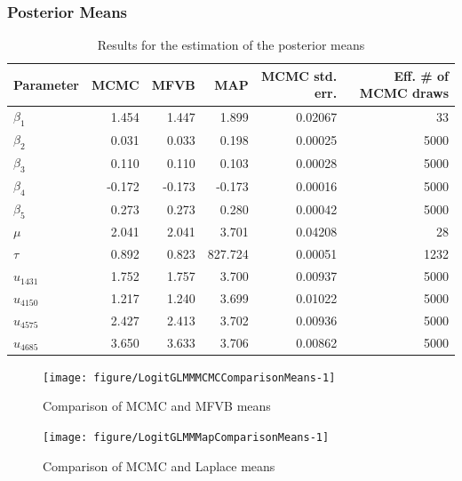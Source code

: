 \documentclass{article}\usepackage[]{graphicx}\usepackage[]{color}
\newenvironment{knitrout}{}{}
\theoremstyle{definition}
\theoremstyle{plain}
\theoremstyle{plain}
\theoremstyle{plain}
\theoremstyle{definition}
\theoremstyle{plain}
\theoremstyle{plain}
\begin{document}
\subsubsection{Posterior Means}

\begin{table}
\begin{center}\begin{tabular}{lrrrrr}
  \hline
Parameter & MCMC & MFVB & MAP & MCMC std. err. & Eff. \# of MCMC draws \\ 
  \hline
$\beta_{1}$ & 1.454 & 1.447 & 1.899 & 0.02067 & 33 \\ 
  $\beta_{2}$ & 0.031 & 0.033 & 0.198 & 0.00025 & 5000 \\ 
  $\beta_{3}$ & 0.110 & 0.110 & 0.103 & 0.00028 & 5000 \\ 
  $\beta_{4}$ & -0.172 & -0.173 & -0.173 & 0.00016 & 5000 \\ 
  $\beta_{5}$ & 0.273 & 0.273 & 0.280 & 0.00042 & 5000 \\ 
  $\mu$ & 2.041 & 2.041 & 3.701 & 0.04208 & 28 \\ 
  $\tau$ & 0.892 & 0.823 & 827.724 & 0.00051 & 1232 \\ 
  $u_{1431}$ & 1.752 & 1.757 & 3.700 & 0.00937 & 5000 \\ 
  $u_{4150}$ & 1.217 & 1.240 & 3.699 & 0.01022 & 5000 \\ 
  $u_{4575}$ & 2.427 & 2.413 & 3.702 & 0.00936 & 5000 \\ 
  $u_{4685}$ & 3.650 & 3.633 & 3.706 & 0.00862 & 5000 \\ 
   \hline
\end{tabular}
\end{center}
\caption{Results for the estimation of the posterior means\label{tab:mean_results}}
\end{table}

\begin{knitrout}
\color{fgcolor}\begin{figure}[t]

{\centering \texttt{[image: figure/LogitGLMMMCMCComparisonMeans-1]} 

}

\caption[Comparison of MCMC and MFVB means]{Comparison of MCMC and MFVB means}\label{fig:LogitGLMMMCMCComparisonMeans}
\end{figure}


\end{knitrout}

\begin{knitrout}
\color{fgcolor}\begin{figure}[t]

{\centering \texttt{[image: figure/LogitGLMMMapComparisonMeans-1]} 

}

\caption[Comparison of MCMC and Laplace means]{Comparison of MCMC and Laplace means}\label{fig:LogitGLMMMapComparisonMeans}
\end{figure}


\end{knitrout}
\end{document}
